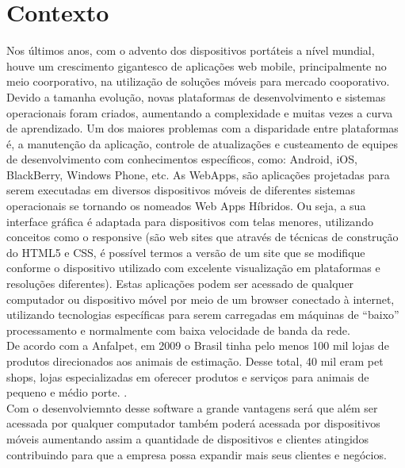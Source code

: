 \documentclass[12pt,openright,twoside,a4paper,english,french,spanish,brazil]{abntex2}
\begin{document}
\section*{Contexto}
Nos últimos anos, com o advento dos dispositivos portáteis a nível mundial, houve um crescimento gigantesco de aplicações web mobile, principalmente no meio coorporativo, na utilização de soluções móveis para mercado cooporativo. Devido a tamanha evolução, novas plataformas de desenvolvimento e sistemas operacionais foram criados, aumentando a complexidade e muitas vezes a curva de aprendizado. Um dos maiores problemas com a disparidade entre plataformas é, a manutenção da aplicação, controle de atualizações e custeamento de equipes de desenvolvimento com conhecimentos específicos, como: Android, iOS, BlackBerry, Windows Phone, etc.
As WebApps, são aplicações projetadas para serem executadas em diversos dispositivos móveis de diferentes sistemas operacionais se tornando os nomeados Web Apps Híbridos. Ou seja, a sua interface gráfica é adaptada para dispositivos com telas menores, utilizando conceitos como o responsive (são web sites que através de técnicas de construção do HTML5 e CSS, é possível termos a versão de um site que se modifique conforme o dispositivo utilizado com excelente visualização em plataformas e resoluções diferentes). Estas aplicações podem ser acessado de qualquer computador ou dispositivo móvel por meio de um browser conectado à internet, utilizando tecnologias específicas para serem carregadas em máquinas de “baixo” processamento e normalmente com baixa velocidade de banda da rede.\\
De acordo com a Anfalpet, em 2009 o Brasil tinha pelo menos 100 mil lojas de produtos direcionados aos animais de estimação. Desse total, 40 mil eram pet shops, lojas especializadas em oferecer produtos e serviços para animais de pequeno e médio porte. \cite{Sebrae2011}.\\
Com o desenvolviemnto desse software a grande vantagens será que além ser acessada por qualquer computador também poderá acessada por dispositivos móveis aumentando assim a quantidade de dispositivos e clientes atingidos contribuindo para que a empresa possa expandir mais seus clientes e negócios.

\end{document}
